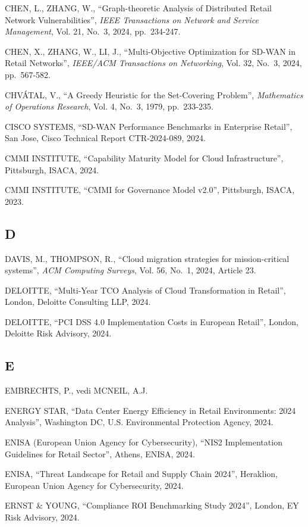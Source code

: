 \documentclass{report}
\begin{document}
CHEN, L., ZHANG, W., ``Graph-theoretic Analysis of Distributed Retail
Network Vulnerabilities'', \emph{IEEE Transactions on Network and
Service Management}, Vol. 21, No.~3, 2024, pp.~234-247.

CHEN, X., ZHANG, W., LI, J., ``Multi-Objective Optimization for SD-WAN
in Retail Networks'', \emph{IEEE/ACM Transactions on Networking}, Vol.
32, No.~3, 2024, pp.~567-582.

CHVÁTAL, V., ``A Greedy Heuristic for the Set-Covering Problem'',
\emph{Mathematics of Operations Research}, Vol. 4, No.~3, 1979,
pp.~233-235.

CISCO SYSTEMS, ``SD-WAN Performance Benchmarks in Enterprise Retail'',
San Jose, Cisco Technical Report CTR-2024-089, 2024.

CMMI INSTITUTE, ``Capability Maturity Model for Cloud Infrastructure'',
Pittsburgh, ISACA, 2024.

CMMI INSTITUTE, ``CMMI for Governance Model v2.0'', Pittsburgh, ISACA,
2023.

\subsection{D}\label{d-1}

DAVIS, M., THOMPSON, R., ``Cloud migration strategies for
mission-critical systems'', \emph{ACM Computing Surveys}, Vol. 56,
No.~1, 2024, Article 23.

DELOITTE, ``Multi-Year TCO Analysis of Cloud Transformation in Retail'',
London, Deloitte Consulting LLP, 2024.

DELOITTE, ``PCI DSS 4.0 Implementation Costs in European Retail'',
London, Deloitte Risk Advisory, 2024.

\subsection{E}\label{e-1}

EMBRECHTS, P., vedi MCNEIL, A.J.

ENERGY STAR, ``Data Center Energy Efficiency in Retail Environments:
2024 Analysis'', Washington DC, U.S. Environmental Protection Agency,
2024.

ENISA (European Union Agency for Cybersecurity), ``NIS2 Implementation
Guidelines for Retail Sector'', Athens, ENISA, 2024.

ENISA, ``Threat Landscape for Retail and Supply Chain 2024'', Heraklion,
European Union Agency for Cybersecurity, 2024.

ERNST \& YOUNG, ``Compliance ROI Benchmarking Study 2024'', London, EY
Risk Advisory, 2024.
\end{document}
